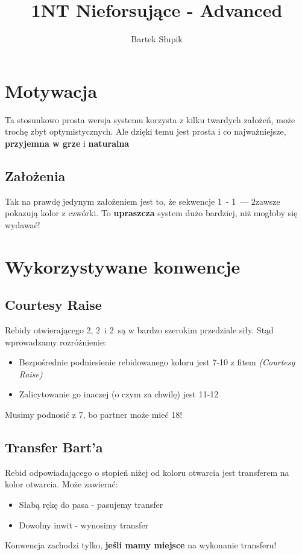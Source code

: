 \documentclass[12pt, a4paper]{article}
\title{1NT Nieforsujące - Advanced}
\author{Bartek Słupik}
\begin{document}
    \maketitle
    \section{Motywacja}
    Ta stosunkowo prosta wersja systemu korzysta z kilku twardych założeń,
    może trochę zbyt optymistycznych. Ale dzięki temu jest prosta i 
    co najważniejsze, \textbf{przyjemna w grze} i \textbf{naturalna}

    \subsection{Założenia}
    Tak na prawdę jedynym założeniem jest to, że
    sekwencje 1\major\ - 1\nt\ --- 2\minor zawsze pokazują kolor z czwórki. 
    To \textbf{upraszcza} system dużo bardziej, niż mogłoby się wydawać!

    \section{Wykorzystywane konwencje}
    \subsection{Courtesy Raise}
    Rebidy otwierającego 2\clubs, 2\diams\ i 2\hearts\ są w bardzo szerokim przedziale siły.
    Stąd wprowadzamy rozróżnienie:
    \begin{itemize}
        \item Bezpośrednie podniesienie rebidowanego koloru jest 7-10 z fitem \emph{(Courtesy Raise)}
        \item Zalicytowanie go inaczej (o czym za chwilę) jest 11-12
    \end{itemize}
    Musimy podnosić z 7\hcp, bo partner może mieć 18!

    \subsection{Transfer Bart'a}
    Rebid odpowiadającego o stopień niżej od koloru otwarcia jest transferem na kolor otwarcia.
    Może zawierać:
    \begin{itemize}
        \item Słabą rękę do pasa - pasujemy transfer
        \item Dowolny inwit - wynosimy transfer
    \end{itemize}
    Konwencja zachodzi tylko, \textbf{jeśli mamy miejsce} na wykonanie transferu!
\end{document}

